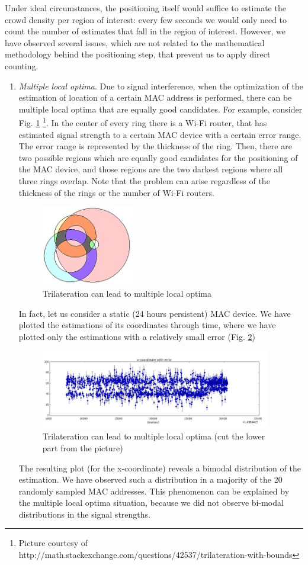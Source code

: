 \documentclass[10pt,a4paper]{article}
\begin{document}
Under ideal circumstances, the positioning itself would suffice to estimate the crowd density per region of interest:  every few seconds we would only need to count the number of estimates that fall in the region of interest. However, we have observed several issues, which are not related to the mathematical methodology behind the positioning step, that prevent us to apply direct counting. 
\begin{enumerate}
	\item
	{\it Multiple local optima}. Due to signal interference, when the optimization of the estimation of location of a certain MAC address is performed, there can be multiple local optima that are equally good candidates. For example, consider Fig. \ref{fig:trilateration_problem} \footnote{Picture courtesy of http://math.stackexchange.com/questions/42537/trilateration-with-bounds}. In the center of every ring there is a Wi-Fi router, that has estimated signal strength to a certain MAC device with a certain error range. The error range is represented by the thickness of the ring. Then, there are two possible regions which are equally good candidates for the positioning of the MAC device, and those regions are the two darkest regions where all three rings overlap. Note that the problem can arise regardless of the thickness of the rings or the number of Wi-Fi routers. 	
	\begin{figure}[h!]
		\centering
		\includegraphics[width=40mm]{trilateration_problem.jpg}
		\caption{Trilateration can lead to multiple local optima}
		\label{fig:trilateration_problem}
	\end{figure}
	In fact, let us consider a static (24 hours persistent) MAC device.  We have  plotted the estimations of its coordinates through time, where we have plotted only the estimations with a relatively small error  (Fig. \ref{fig:bimodal})
	\begin{figure}[h!]
		\centering
		\includegraphics[width=100mm]{bimodal.jpg}
		\caption{Trilateration can lead to multiple local optima (cut the lower part from the picture)}
		\label{fig:bimodal}
	\end{figure} 
	The resulting plot (for the x-coordinate) reveals a bimodal distribution of the estimation. We have observed such a distribution in a majority of the 20 randomly sampled MAC addresses. This phenomenon can be explained by the multiple local optima situation, because we did not observe bi-modal distributions in the signal strengths. 
	

\end{enumerate}
\end{document}
